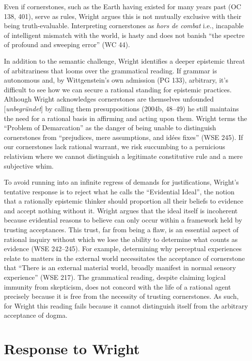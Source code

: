 Even if cornerstones, such as the Earth having existed for many years
past (OC 138, 401), serve as rules, Wright argues this is not mutually
exclusive with their being truth-evaluable. Interpreting cornerstones as
\emph{hors de combat} i.e., incapable of intelligent mismatch with the
world, is hasty and does not banish ``the spectre of profound and
sweeping error'' (WC 44).

In addition to the semantic challenge, Wright identifies a deeper
epistemic threat of arbitrariness that looms over the grammatical
reading. If grammar is autonomous and, by Wittgenstein's own admission
(PG 133), arbitrary, it's difficult to see how we can secure a rational
standing for epistemic practices. Although Wright acknowledges
cornerstones are themselves unfounded {[}\emph{unbegründet}{]} by
calling them presuppositions (2004b, 48--49) he still maintains the need
for a rational basis in affirming and acting upon them. Wright terms the
``Problem of Demarcation'' as the danger of being unable to distinguish
cornerstones from ``prejudices, mere assumptions, and idées fixes'' (WSE
245). If our cornerstones lack rational warrant, we risk succumbing to a
pernicious relativism where we cannot distinguish a legitimate
constitutive rule and a mere subjective whim.

To avoid running into an infinite regress of demands for justifications,
Wright's tentative response is to reject what he calls the ``Evidential
Ideal'', the notion that a rationally epistemic thinker should
proportion all their beliefs to evidence and accept nothing without it.
Wright argues that the ideal itself is incoherent because evidential
reasons to believe can only occur within a framework held by trusting
acceptances. This trust, far from being a flaw, is an essential aspect
of rational inquiry without which we lose the ability to determine what
counts as evidence (WSE 242--245). For example, determining why
perceptual experiences relate to matters in the external world
necessitates the acceptance of cornerstone that ``There is an external
material world, broadly manifest in normal sensory experience'' (WSE
217). The grammatical reading, despite claiming logical immunity from
skepticism, does not concord with the life of a rational agent precisely
because it is free from the necessity of trusting cornerstones. As such,
for Wright this reading fails because it cannot distinguish itself from
the arbitrary acceptance of dogma.

\section{Response to Wright}

